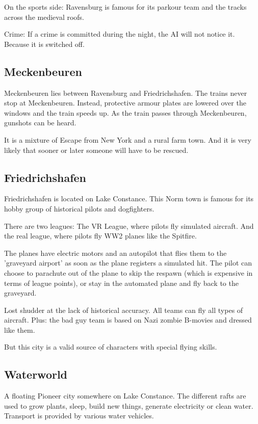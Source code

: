 On the sports side: Ravensburg is famous for its parkour team and the tracks across the medieval roofs.

Crime: If a crime is committed during the night, the AI will not notice it. Because it is switched off.

\subsection{Meckenbeuren}
\label{subsec:Meckenbeuren}

Meckenbeuren lies between Ravensburg and Friedrichshafen. The trains never stop at Meckenbeuren. Instead, protective armour plates are lowered over the windows and the train speeds up. As the train passes through Meckenbeuren, gunshots can be heard.

It is a mixture of Escape from New York and a rural farm town. And it is very likely that sooner or later someone will have to be rescued.

\subsection{Friedrichshafen}
\label{subsec:Friedrichshafen}

Friedrichshafen is located on Lake Constance. This Norm town is famous for its hobby group of historical pilots and dogfighters.

There are two leagues: The VR League, where pilots fly simulated aircraft. And the real league, where pilots fly WW2 planes like the Spitfire.

The planes have electric motors and an autopilot that flies them to the 'graveyard airport' as soon as the plane registers a simulated hit.
The pilot can choose to parachute out of the plane to skip the respawn (which is expensive in terms of league points), or stay in the automated plane and fly back to the graveyard.

Lost shudder at the lack of historical accuracy. All teams can fly all types of aircraft. Plus: the bad guy team is based on Nazi zombie B-movies and dressed like them.

But this city is a valid source of characters with special flying skills.

\subsection{Waterworld}
\label{subsec:Waterworld}

A floating Pioneer city somewhere on Lake Constance. The different rafts are used to grow plants, sleep, build new things, generate electricity or clean water. Transport is provided by various water vehicles.




